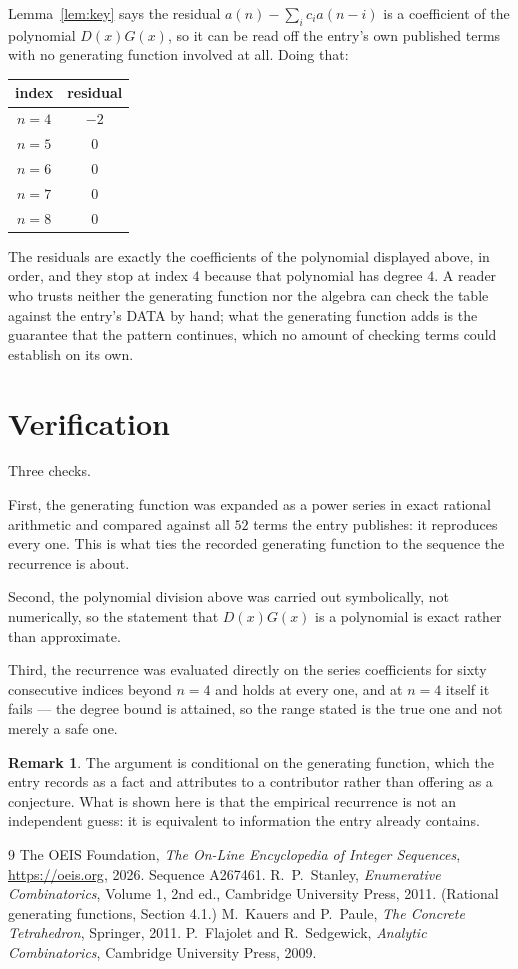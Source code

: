 \documentclass[11pt,a4paper]{article}
\theoremstyle{plain}
\theoremstyle{definition}
\newtheorem{remark}[theorem]{Remark}
\begin{document}
Lemma~\ref{lem:key} says the residual $a(n)-\sum_ic_ia(n-i)$ is a coefficient of the
polynomial $D(x)G(x)$, so it can be read off the entry's own published terms with no
generating function involved at all. Doing that:
\begin{center}
\begin{tabular}{cc}
index & residual \\ \hline
$n=4$ & $-2$ \\
$n=5$ & $0$ \\
$n=6$ & $0$ \\
$n=7$ & $0$ \\
$n=8$ & $0$
\end{tabular}
\end{center}
The residuals are exactly the coefficients of the polynomial displayed above, in order, and
they stop at index $4$ because that polynomial has degree $4$. A reader who trusts
neither the generating function nor the algebra can check the table against the entry's DATA
by hand; what the generating function adds is the guarantee that the pattern continues, which
no amount of checking terms could establish on its own.

\section{Verification}

Three checks.

First, the generating function was expanded as a power series in exact rational arithmetic and
compared against all $52$ terms the entry publishes: it reproduces every one. This is
what ties the recorded generating function to the sequence the recurrence is about.

Second, the polynomial division above was carried out symbolically, not numerically, so the
statement that $D(x)G(x)$ is a polynomial is exact rather than approximate.

Third, the recurrence was evaluated directly on the series coefficients for sixty consecutive
indices beyond $n=4$ and holds at every one, and at $n=4$ itself it fails --- the
degree bound is attained, so the range stated is the true one and not merely a safe one.

\begin{remark}
The argument is conditional on the generating function, which the entry records as a fact and
attributes to a contributor rather than offering as a conjecture. What is shown here is that
the empirical recurrence is not an independent guess: it is equivalent to information the
entry already contains.
\end{remark}

\begin{thebibliography}{9}
 The OEIS Foundation, \emph{The On-Line Encyclopedia of Integer
Sequences}, \url{https://oeis.org}, 2026. Sequence A267461.
 R.~P.~Stanley, \emph{Enumerative Combinatorics}, Volume 1, 2nd ed.,
Cambridge University Press, 2011. (Rational generating functions, Section 4.1.)
 M.~Kauers and P.~Paule, \emph{The Concrete Tetrahedron}, Springer, 2011.
 P.~Flajolet and R.~Sedgewick, \emph{Analytic Combinatorics}, Cambridge
University Press, 2009.
\end{thebibliography}
\end{document}
